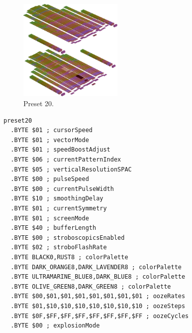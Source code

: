 \vspace*{-0.5cm}
\begin{minipage}[b]{0.48\linewidth}
\begin{figure}[H]                                                          
  \centering                                                             
  \begin{adjustbox}{width=5cm,center}                                   
  \includegraphics[width=5cm]{src/colorspace_presets/preset20-45.png}%
  \end{adjustbox}                                                        
\caption*{Preset 20.}                                           
\end{figure}                                                               
\end{minipage}
\hspace{0.1cm}
\begin{minipage}[b]{0.48\linewidth}                                                                         
\begin{lstlisting}[basicstyle=\ttfamily\tiny]
preset20
  .BYTE $01 ; cursorSpeed
  .BYTE $01 ; vectorMode
  .BYTE $01 ; speedBoostAdjust
  .BYTE $06 ; currentPatternIndex
  .BYTE $05 ; verticalResolutionSPAC
  .BYTE $00 ; pulseSpeed
  .BYTE $00 ; currentPulseWidth
  .BYTE $10 ; smoothingDelay
  .BYTE $01 ; currentSymmetry
  .BYTE $01 ; screenMode
  .BYTE $40 ; bufferLength
  .BYTE $00 ; stroboscopicsEnabled
  .BYTE $02 ; stroboFlashRate
  .BYTE BLACK0,RUST8 ; colorPalette
  .BYTE DARK_ORANGE8,DARK_LAVENDER8 ; colorPalette
  .BYTE ULTRAMARINE_BLUE8,DARK_BLUE8 ; colorPalette
  .BYTE OLIVE_GREEN8,DARK_GREEN8 ; colorPalette
  .BYTE $00,$01,$01,$01,$01,$01,$01,$01 ; oozeRates
  .BYTE $01,$10,$10,$10,$10,$10,$10,$10 ; oozeSteps
  .BYTE $0F,$FF,$FF,$FF,$FF,$FF,$FF,$FF ; oozeCycles
  .BYTE $00 ; explosionMode
\end{lstlisting}
\end{minipage}


